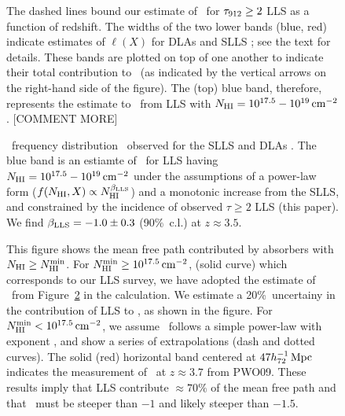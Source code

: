 \documentclass[12pt,preprint]{aastex}
\begin{document}

\begin{figure}
\caption{
The dashed lines bound our estimate of \llls\ for $\tau_{\rm 912} \ge 2$ LLS
as a function of redshift. The widths of the
two lower bands (blue, red) indicate estimates of $\ell(X)$ for
DLAs and SLLS \citep{opb+07,pw09}; see the text for details. 
These bands are plotted on top of one another to indicate their total
contribution to \llls\ (as indicated by the vertical arrows on the right-hand
side of the figure).  The (top) blue band, therefore, represents the 
estimate to \llls\ from LLS
with $N_{\rm HI} = 10^{17.5} - 10^{19} \, {\rm cm^{-2}}$. 
[COMMENT MORE]
}
\label{fig:complox}
\end{figure}

\begin{figure}
\caption{\nhi\ frequency distribution \fnhi\ observed for the 
SLLS \citep[green, $\mnhi = 10^{19} - 10^{20.3} \cm{-2}$;][]{opb+07}
and DLAs \citep[red, $\mnhi \ge 10^{20.3} \cm{-2}$;][]{pw09}.
The blue band is an estiamte of \fnhi\ for LLS having 
$N_{\rm HI} = 10^{17.5} - 10^{19} \, {\rm cm^{-2}}$ under the assumptions
of a power-law form ($f(N_{\rm HI},X) \propto N_{\rm HI}^{\beta_{\rm LLS}}$)
and a monotonic increase from the SLLS, 
and constrained by the incidence of observed $\tau \ge 2$ LLS (this paper).
We find $\beta_{\rm LLS} = -1.0 \pm 0.3$ (90\%\ c.l.) at $z \approx 3.5$.
}
\label{fig:fN}
\end{figure}

\begin{figure}
\caption{This figure shows the mean free path contributed
by absorbers with $N_{\rm HI} \ge N_{\rm HI}^{\rm min}$. For $N_{\rm HI}^{\rm min} \ge 10^{17.5} \, {\rm cm^{-2}}$,
(solid curve) which corresponds to our LLS survey, we have adopted
the estimate of \fnhi\ from Figure~\ref{fig:fN} in the calculation.
We estimate a 20\%\ uncertainy in the contribution of LLS to
\lmfp, as shown in the figure.  For $N_{\rm HI}^{\rm min} < 10^{17.5} \, {\rm cm^{-2}}$,
we assume \fnhi\ follows a simple power-law with exponent \bplls,
and show a series of extrapolations (dash and dotted curves).
The solid (red) horizontal band centered at $47 {h_{72}^{-1} \, \rm Mpc}$
indicates the measurement of \lmfp\ at $z \approx 3.7$ from PWO09.
These results imply that LLS contribute $\approx 70\%$ of the 
mean free path and that \bplls\ must be steeper than $-1$
and likely steeper than $-1.5$.
}
\label{fig:mfp}
\end{figure}
\end{document}

